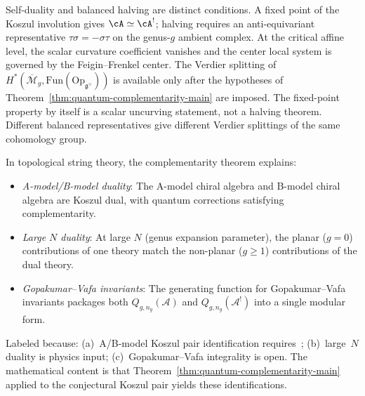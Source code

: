 \begin{remark}[Significance]\label{rem:self-dual-significance}
Self-duality and balanced halving are distinct conditions. A fixed
point of the Koszul involution gives $\cA\simeq\cA^!$; halving
requires an anti-equivariant representative
$\tau\sigma=-\sigma\tau$ on the genus-$g$ ambient complex. At the
critical affine level, the scalar curvature coefficient vanishes and
the center local system is governed by the Feigin--Frenkel center.
The Verdier splitting of
$H^*(\overline{\mathcal{M}}_g,
\mathrm{Fun}(\mathrm{Op}_{\mathfrak{g}^\vee}))$ is available only
after the hypotheses of Theorem~\ref{thm:quantum-complementarity-main}
are imposed. The fixed-point property by itself is a scalar
uncurving statement, not a halving theorem. Different balanced
representatives give different Verdier splittings of the same
cohomology group.
\end{remark}

\begin{conjecture}
\label{conj:string-theory-complementarity-explicit}
In topological string theory, the complementarity theorem explains:
\begin{itemize}
\item \emph{A-model/B-model duality}: The A-model chiral algebra and B-model chiral
algebra are Koszul dual, with quantum corrections satisfying complementarity.

\item \emph{Large $N$ duality}: At large $N$ (genus expansion parameter), the
planar ($g=0$) contributions of one theory match the non-planar ($g \geq 1$)
contributions of the dual theory.

\item \emph{Gopakumar--Vafa invariants}: The generating function for Gopakumar--Vafa
invariants packages both $Q_{g,n_g}(\mathcal{A})$ and $Q_{g,n_g}(\mathcal{A}^!)$ into a single
modular form.
\end{itemize}
\end{conjecture}

\begin{remark}
Labeled \ClaimStatusHeuristic{} because: (a)~A/B-model Koszul pair
identification requires~\cite{CL16}; (b)~large~$N$ duality is
physics input; (c)~Gopakumar--Vafa integrality is open.
The mathematical content is that Theorem~\ref{thm:quantum-complementarity-main}
applied to the conjectural Koszul pair yields these identifications.
\end{remark}

